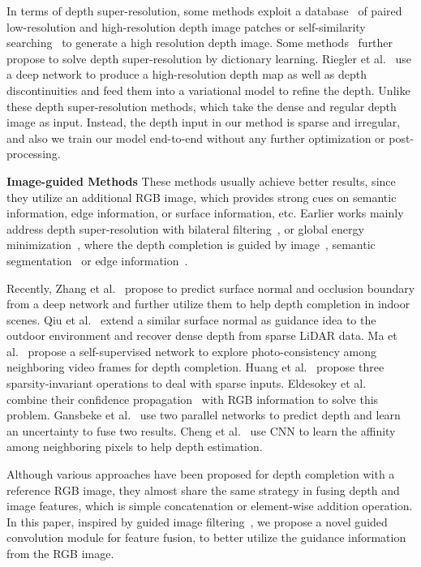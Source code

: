 \documentclass[journal]{IEEEtran}
\begin{document}
In terms of depth super-resolution, some methods exploit a database~\cite{patch_super_res} of paired low-resolution and high-resolution depth image patches or
self-similarity searching~\cite{depth_rigid_similarity} to generate a high resolution depth image.
Some methods~\cite{var_super_edge, joint_super_denoise} further propose to solve depth super-resolution  by dictionary learning.
Riegler et al.~\cite{atgv_net} use a deep network to produce a high-resolution depth map as well as depth discontinuities and feed them into a variational model to refine the depth.
Unlike these depth super-resolution methods, which take the dense and regular depth image as input.
Instead, the depth input in our method is sparse and irregular, and also we train our model end-to-end without any further optimization or post-processing. 


{\bf Image-guided Methods}
These methods usually achieve better results, since they utilize an additional RGB image, which provides strong cues on semantic information, edge information, or surface information, etc.
Earlier works mainly address depth super-resolution with bilateral filtering~\cite{spatial_depth_range}, or global energy minimization~\cite{high_quality_3d_tof, high_quality_3d_tip, guided_depth_tgv},
where the depth completion is guided by image~\cite{spatial_depth_range, high_quality_3d_tof, high_quality_3d_tip, guided_depth_tgv}, semantic segmentation~\cite{semantic_upsampling} or edge information~\cite{edge_guided_depth}.


Recently, Zhang et al.~\cite{deep_indoor_rgbd} propose to predict surface normal and occlusion boundary from a deep network and further utilize them to help depth completion in indoor scenes.
Qiu et al.~\cite{deep_lidar} extend a similar surface normal as guidance idea to the outdoor environment and recover dense depth from sparse LiDAR data.
Ma et al.~\cite{self_supervised} propose a self-supervised network to explore photo-consistency among neighboring video frames for depth completion. 
Huang et al.~\cite{hms_net} propose three sparsity-invariant operations to deal with sparse inputs.
Eldesokey et al.~\cite{cnn_confidence} combine their confidence propagation~\cite{propagating_confidences} with RGB information to solve this problem.
Gansbeke et al.~\cite{sparse_noisy} use two parallel networks to predict depth and learn an uncertainty to fuse two results.
Cheng et al.~\cite{depth_affinity} use CNN to learn the affinity among neighboring pixels to help depth estimation. 


Although various approaches have been proposed for depth completion with a reference RGB image,
they almost share the same strategy in fusing depth and image features, which is simple concatenation or element-wise addition operation.
In this paper, inspired by guided image filtering~\cite{guided_filter},
we propose a novel guided convolution module for feature fusion, to better utilize the guidance information from the RGB image. 
\end{document}
